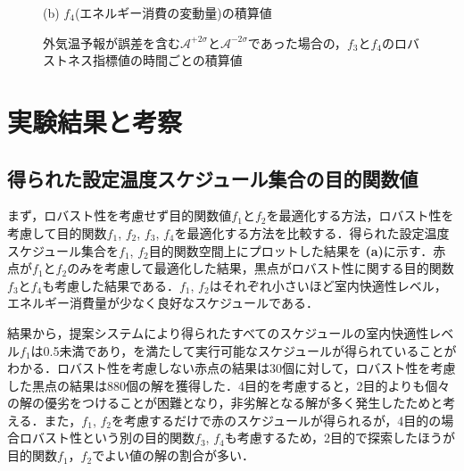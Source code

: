 \begin{figure}[htbp]
\begin{center}
\begin{minipage}{.7\textwidth}
\begin{center}
                {(b) $f_4$(エネルギー消費の変動量)の積算値}
            \end{center}
        \end{minipage}
        \vspace{-0.0cm}
        \caption{外気温予報が誤差を含む$\mathcal{A}^{+2\sigma}$と$\mathcal{A}^{-2\sigma}$であった場合の，$f_3$と$f_4$のロバストネス指標値の時間ごとの積算値}
        \label{fig::robust_result_schedule_accumulated}
    \end{center}
\end{figure}

\section{実験結果と考察}
\subsection{得られた設定温度スケジュール集合の目的関数値}
まず，ロバスト性を考慮せず目的関数値$f_1$と$f_2$を最適化する方法，ロバスト性を考慮して目的関数$f_1$, $f_2$, $f_3$, $f_4$を最適化する方法を比較する．得られた設定温度スケジュール集合を$f_1$, $f_2$目的関数空間上にプロットした結果を {\bf (a)}に示す．赤点が$f_1$と$f_2$のみを考慮して最適化した結果，黒点がロバスト性に関する目的関数$f_3$と$f_4$も考慮した結果である．$f_1$, $f_2$はそれぞれ小さいほど室内快適性レベル，エネルギー消費量が少なく良好なスケジュールである．

結果から，提案システムにより得られたすべてのスケジュールの室内快適性レベル$f_1$は0.5未満であり，を満たして実行可能なスケジュールが得られていることがわかる．ロバスト性を考慮しない赤点の結果は30個に対して，ロバスト性を考慮した黒点の結果は880個の解を獲得した．4目的を考慮すると，2目的よりも個々の解の優劣をつけることが困難となり，非劣解となる解が多く発生したためと考える．また，$f_1$, $f_2$を考慮するだけで赤のスケジュールが得られるが，4目的の場合ロバスト性という別の目的関数$f_3$, $f_4$も考慮するため，2目的で探索したほうが目的関数$f_1$，$f_2$でよい値の解の割合が多い．


